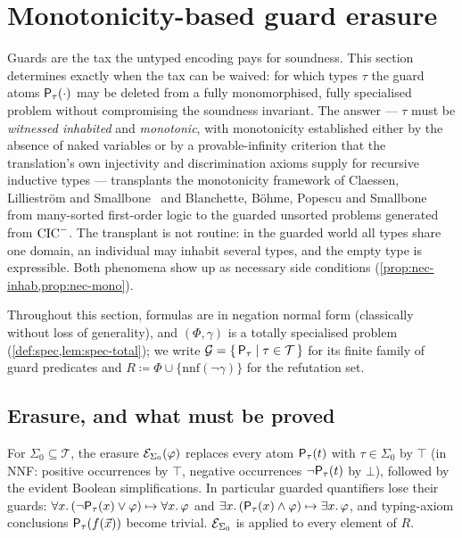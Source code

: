 \section{Monotonicity-based guard erasure}
\label{sec:erasure}

Guards are the tax the untyped encoding pays for soundness.  This
section determines exactly when the tax can be waived: for which
types $\tau$ the guard atoms $\mathsf{P}_{\tau}(\cdot)$ may be deleted
from a fully monomorphised, fully specialised problem without
compromising the soundness invariant.  The answer --- $\tau$ must be
\emph{witnessed inhabited} and \emph{monotonic}, with monotonicity
established either by the absence of naked variables or by a
provable-infinity criterion that the translation's own injectivity
and discrimination axioms supply for recursive inductive types ---
transplants the monotonicity framework of Claessen, Lillieström and
Smallbone~\cite{Claessen2011} and Blanchette, B\"ohme, Popescu and
Smallbone~\cite{Blanchette2016} from many-sorted first-order logic
to the guarded unsorted problems generated from $\mathrm{CIC}^{-}$.  The
transplant is not routine: in the guarded world all types share one
domain, an individual may inhabit several types, and the empty type
is expressible.  Both phenomena show up as necessary side conditions
(\cref{prop:nec-inhab,prop:nec-mono}).

Throughout this section, formulas are in negation normal form
(classically without loss of generality), and $(\Phi, \gamma)$ is a
totally specialised problem (\cref{def:spec,lem:spec-total}); we
write $\mathcal{G} = \{\,\mathsf{P}_{\tau} \mid \tau \in \mathcal{T}\,\}$ for
its finite family of guard predicates and $R \coloneqq \Phi \cup
\{\mathrm{nnf}(\neg\gamma)\}$ for the refutation set.

\subsection{Erasure, and what must be proved}

\begin{definition}[Erasure]
\label{def:erasure}
For $\Sigma_0 \subseteq \mathcal{T}$, the erasure
$\mathcal{E}_{\Sigma_0}(\varphi)$ replaces every atom $\mathsf{P}_{\tau}(t)$
with $\tau \in \Sigma_0$ by $\top$ (in NNF: positive occurrences by
$\top$, negative occurrences $\neg\mathsf{P}_{\tau}(t)$ by $\bot$),
followed by the evident Boolean simplifications.  In particular
guarded quantifiers lose their guards: $\forall x.\,
(\neg\mathsf{P}_{\tau}(x) \vee \varphi) \mapsto \forall x.\, \varphi$ and
$\exists x.\, (\mathsf{P}_{\tau}(x) \wedge \varphi) \mapsto \exists x.\,
\varphi$, and typing-axiom conclusions $\mathsf{P}_{\tau}(f(\vec{x}))$
become trivial.  $\mathcal{E}_{\Sigma_0}$ is applied to every element of
$R$.
\end{definition}

